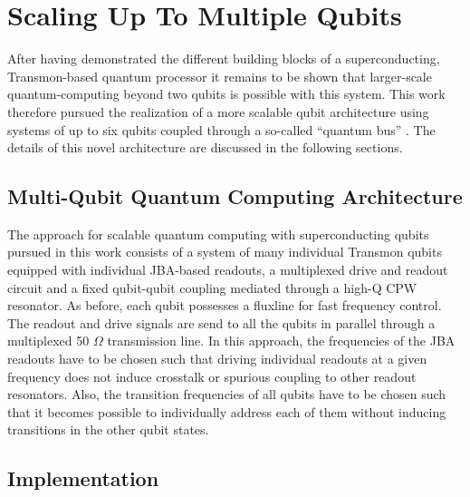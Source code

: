 \section{Scaling Up To Multiple Qubits}

After having demonstrated the different building blocks of a superconducting, Transmon-based quantum processor it remains to be shown that larger-scale quantum-computing beyond two qubits is possible with this system. This work therefore pursued the realization of a more scalable qubit architecture using systems of up to six qubits coupled through a so-called ``quantum bus'' \citep{majer_coupling_2007}. The details of this novel architecture are discussed in the following sections.

\subsection{Multi-Qubit Quantum Computing Architecture}

The approach for scalable quantum computing with superconducting qubits pursued in this work consists of a system of many individual Transmon qubits equipped with individual JBA-based readouts, a multiplexed drive and readout circuit and a fixed qubit-qubit coupling mediated through a high-Q CPW resonator. As before, each qubit possesses a fluxline for fast frequency control. The readout and drive signals are send to all the qubits in parallel through a multiplexed 50 $\Omega$ transmission line. In this approach, the frequencies of the JBA readouts have to be chosen such that driving individual readouts at a given frequency does not induce crosstalk or spurious coupling to other readout resonators. Also, the transition frequencies of all qubits have to be chosen such that it becomes possible to individually address each of them without inducing transitions in the other qubit states.

\subsection{Implementation}

